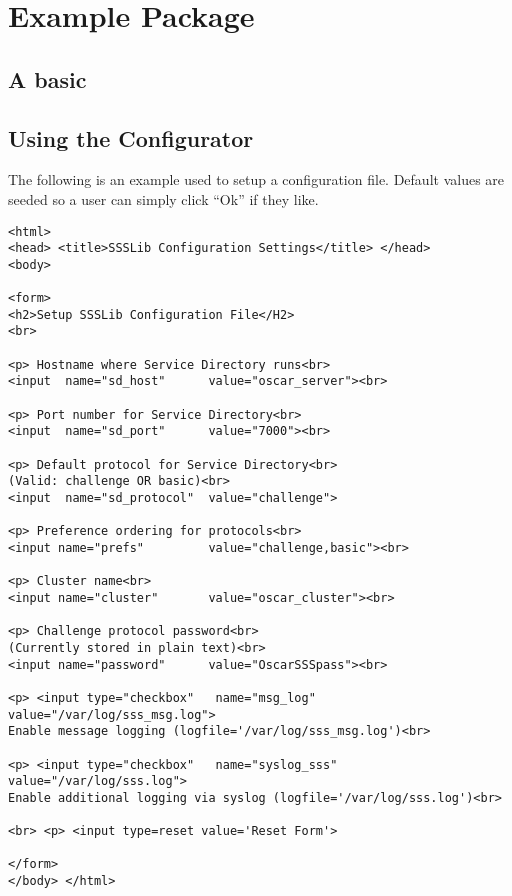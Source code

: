 
\section{Example Package}
\label{sect:example-pkg}

\subsection{A basic }
\label{sect:example-config-xml}

\subsection{Using the Configurator}
\label{sect:example-configurator}

The following is an example  used to setup a
configuration file.  Default values are seeded so a user can simply click
``Ok'' if they like.

\begin{small}
\begin{verbatim}
<html>
<head> <title>SSSLib Configuration Settings</title> </head> 
<body>

<form>
<h2>Setup SSSLib Configuration File</H2>
<br>

<p> Hostname where Service Directory runs<br>
<input  name="sd_host"      value="oscar_server"><br>

<p> Port number for Service Directory<br>
<input  name="sd_port"      value="7000"><br>

<p> Default protocol for Service Directory<br>
(Valid: challenge OR basic)<br>
<input  name="sd_protocol"  value="challenge">  

<p> Preference ordering for protocols<br>
<input name="prefs"         value="challenge,basic"><br>

<p> Cluster name<br>
<input name="cluster"       value="oscar_cluster"><br>

<p> Challenge protocol password<br>
(Currently stored in plain text)<br>
<input name="password"      value="OscarSSSpass"><br>   

<p> <input type="checkbox"   name="msg_log"   value="/var/log/sss_msg.log">
Enable message logging (logfile='/var/log/sss_msg.log')<br>

<p> <input type="checkbox"   name="syslog_sss"   value="/var/log/sss.log">   
Enable additional logging via syslog (logfile='/var/log/sss.log')<br>

<br> <p> <input type=reset value='Reset Form'>

</form>
</body> </html>
\end{verbatim}
\end{small}


